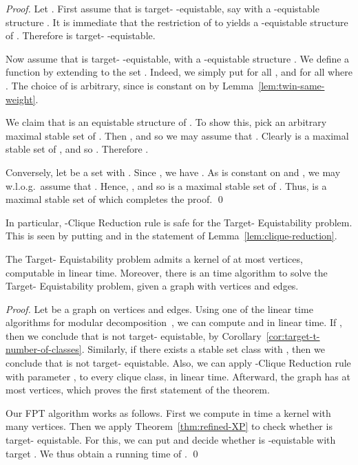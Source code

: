 \documentclass{llncs}
\begin{document}
\begin{proof}
Let . First assume that  is target- -equistable, say with a -equistable structure .
It is immediate that the restriction  of  to  yields a -equistable structure  of .
Therefore  is target- -equistable.

Now assume that  is target- -equistable, with a -equistable structure .
We define a function  by extending  to the set .
Indeed, we simply put  for all , and  for all  where .
The choice of  is arbitrary, since  is constant on  by Lemma~\ref{lem:twin-same-weight}.

We claim that  is an equistable structure of .
To show this, pick an arbitrary maximal stable set  of .
Then , and so we may assume that .
Clearly  is a maximal stable set of , and so .
Therefore .

Conversely, let  be a set with .
Since , we have .
As  is constant on  and , we may w.l.o.g.~assume that .
Hence, , and so  is a maximal stable set of .
Thus,  is a maximal stable set of  which completes the proof.
\qed \end{proof}

In particular, -Clique Reduction rule is safe for the {\sc Target- Equistability} problem.
This is seen by putting  and  in the statement of Lemma~\ref{lem:clique-reduction}.

\begin{theorem}\label{thm:t-equistable}
The {\sc Target- Equistability} problem admits a kernel of at most  vertices, computable in linear time.
Moreover, there is an  time algorithm to solve the {\sc Target- Equistability} problem,
given a graph with  vertices and  edges.
\end{theorem}
\begin{proof}
Let  be a graph on  vertices and  edges.
Using one of the linear time algorithms for modular decomposition~\cite{MR2500307,DBLP:conf/caap/CournierH94,MR1687819}, we can compute  and  in linear time.
If , then we conclude that  is not target- equistable, by Corollary~\ref{cor:target-t-number-of-classes}.
Similarly, if there exists a stable set class  with , then we conclude that  is not target- equistable.
Also, we can apply -Clique Reduction rule with parameter , to every clique class, in linear time.
Afterward, the graph has at most  vertices, which proves the first statement of the theorem.

Our FPT algorithm works as follows.
First we compute in time  a kernel  with  many vertices.
Then we apply Theorem~\ref{thm:refined-XP} to check whether  is target- equistable.
For this, we can put  and decide whether  is -equistable with target .
We thus obtain a running time of
\hbox{}.
\qed \end{proof}
\end{document}
